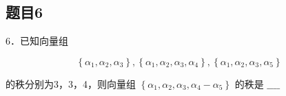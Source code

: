 \documentclass{article}
\begin{document}
\subsection{题目6}
6．已知向量组

\[
\left\{\alpha_{1}, \alpha_{2}, \alpha_{3}\right\},\left\{\alpha_{1}, \alpha_{2}, \alpha_{3}, \alpha_{4}\right\},\left\{\alpha_{1}, \alpha_{2}, \alpha_{3}, \alpha_{5}\right\}
\]

的秩分别为3，3，4，则向量组 \(\left\{\alpha_{1}, \alpha_{2}, \alpha_{3}, \alpha_{4}-\alpha_{5}\right\}\) 的秩是 \(\_\_\_\_\)
\end{document}

